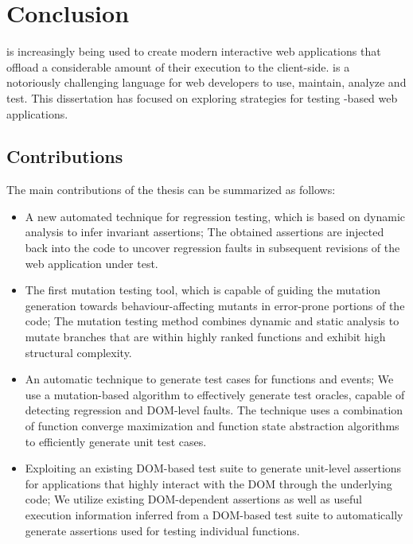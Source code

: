 \chapter{Conclusion} \label{Chap:conc}
\javascript is increasingly being used to create modern interactive web applications that offload a considerable amount of their execution to the client-side. \javascript is a notoriously challenging language for web developers to use, maintain, analyze and test. This dissertation has focused on exploring strategies for testing \javascript-based web applications.
\section{Contributions}
The main contributions of the thesis can be summarized as follows:
\begin{itemize}
\item A new automated technique for \javascript regression testing, which is based on dynamic analysis to infer invariant assertions; The obtained assertions are injected back into the \javascript code to uncover regression faults in subsequent revisions of the web application under test. 
\item The first \javascript mutation testing tool, which is capable of guiding the mutation generation towards behaviour-affecting mutants in error-prone portions of the code; The mutation testing method combines dynamic and static analysis to mutate branches that are within highly ranked functions and exhibit high structural complexity.
\item An automatic technique to generate test cases for \javascript functions and events; We use a mutation-based algorithm to effectively generate test oracles, capable of detecting regression \javascript and DOM-level faults. The technique uses a combination of function converge maximization and function state abstraction algorithms to efficiently generate unit test cases.
\item Exploiting an existing DOM-based test suite to generate unit-level assertions for applications that highly interact with the DOM through the underlying \javascript code; We utilize
existing DOM-dependent assertions as well as useful execution information inferred from a DOM-based test suite to automatically generate assertions used for testing individual \javascript functions.
\end{itemize}